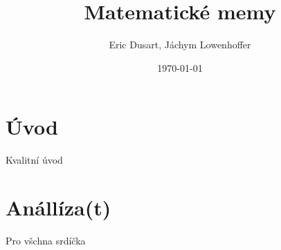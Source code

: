 \documentclass{article}
\title{Matematické memy}
\author{Eric Dusart, Jáchym Lowenhoffer}
\date{\today}
\begin{document}
\begin{titlepage}
\maketitle
\end{titlepage}
\section{Úvod}
Kvalitní úvod
\section{Anállíza(t)}
Pro všchna srdíčka 
\end{document}
